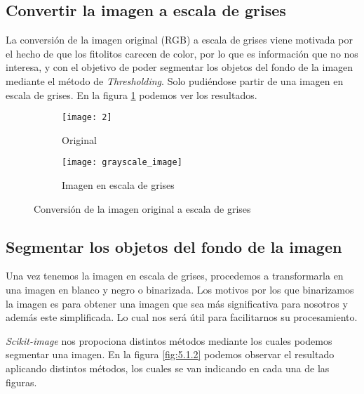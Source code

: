 \subsection{Convertir la imagen a escala de grises}

La conversión de la imagen original (RGB) a escala de grises viene motivada por el hecho de que los fitolitos carecen de color, por lo que es información que no nos interesa, y con el objetivo de poder segmentar los objetos del fondo de la imagen mediante el método de \textit{Thresholding}. Solo pudiéndose partir de una imagen en escala de grises. En la figura \ref{fig:5.1.1} podemos ver los resultados.

\begin{figure}
	\centering
	\begin{subfigure}[b]{0.45\textwidth}
        \texttt{[image: 2]}
        \caption{Original}
    \end{subfigure}
    \hspace{1em}
    \begin{subfigure}[b]{0.45\textwidth}
        \texttt{[image: grayscale\_image]}
        \caption{Imagen en escala de grises}
    \end{subfigure}
    \caption{Conversión de la imagen original a escala de grises}
	\label{fig:5.1.1}
\end{figure}

\subsection{Segmentar los objetos del fondo de la imagen}

Una vez tenemos la imagen en escala de grises, procedemos a transformarla en una imagen en blanco y negro o binarizada. Los motivos por los que binarizamos la imagen es para obtener una imagen que sea más significativa para nosotros y además este simplificada. Lo cual nos será útil para facilitarnos su procesamiento.

\textit{Scikit-image} nos propociona distintos métodos mediante los cuales podemos segmentar una imagen. En la figura \ref{fig:5.1.2} podemos observar el resultado aplicando distintos métodos, los cuales se van indicando en cada una de las figuras.

